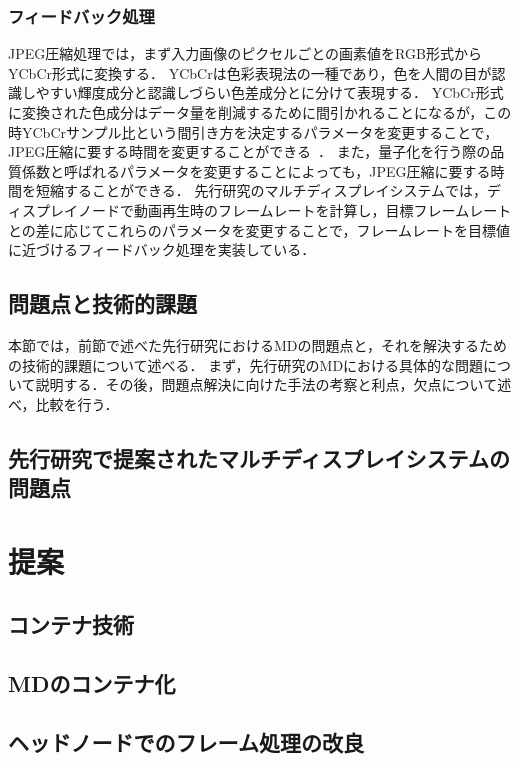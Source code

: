 \documentclass[12pt,a4paper]{jbook}
\begin{document}
\subsection{フィードバック処理}

JPEG圧縮処理では，まず入力画像のピクセルごとの画素値をRGB形式からYCbCr形式に変換する．
YCbCrは色彩表現法の一種であり，色を人間の目が認識しやすい輝度成分と認識しづらい色差成分とに分けて表現する\cite{YCbCr}．
YCbCr形式に変換された色成分はデータ量を削減するために間引かれることになるが，この時YCbCrサンプル比という間引き方を決定するパラメータを変更することで，
JPEG圧縮に要する時間を変更することができる~\cite{jpeg2}．
また，量子化を行う際の品質係数と呼ばれるパラメータを変更することによっても，JPEG圧縮に要する時間を短縮することができる．
先行研究のマルチディスプレイシステムでは，ディスプレイノードで動画再生時のフレームレートを計算し，目標フレームレートとの差に応じてこれらのパラメータを変更することで，フレームレートを目標値に近づけるフィードバック処理を実装している．





\section{問題点と技術的課題}

本節では，前節で述べた先行研究におけるMDの問題点と，それを解決するための技術的課題について述べる．
まず，先行研究のMDにおける具体的な問題について説明する．その後，問題点解決に向けた手法の考察と利点，欠点について述べ，比較を行う．

\section{先行研究で提案されたマルチディスプレイシステムの問題点}

\chapter{提案}


\section{コンテナ技術}

\section{MDのコンテナ化}

\section{ヘッドノードでのフレーム処理の改良}
\end{document}

